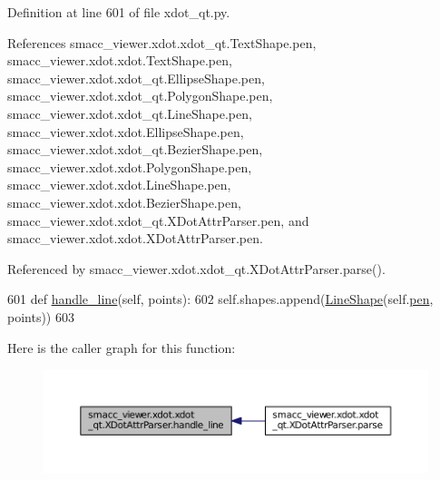 Definition at line 601 of file xdot\+\_\+qt.\+py.



References smacc\+\_\+viewer.\+xdot.\+xdot\+\_\+qt.\+Text\+Shape.\+pen, smacc\+\_\+viewer.\+xdot.\+xdot.\+Text\+Shape.\+pen, smacc\+\_\+viewer.\+xdot.\+xdot\+\_\+qt.\+Ellipse\+Shape.\+pen, smacc\+\_\+viewer.\+xdot.\+xdot\+\_\+qt.\+Polygon\+Shape.\+pen, smacc\+\_\+viewer.\+xdot.\+xdot\+\_\+qt.\+Line\+Shape.\+pen, smacc\+\_\+viewer.\+xdot.\+xdot.\+Ellipse\+Shape.\+pen, smacc\+\_\+viewer.\+xdot.\+xdot\+\_\+qt.\+Bezier\+Shape.\+pen, smacc\+\_\+viewer.\+xdot.\+xdot.\+Polygon\+Shape.\+pen, smacc\+\_\+viewer.\+xdot.\+xdot.\+Line\+Shape.\+pen, smacc\+\_\+viewer.\+xdot.\+xdot.\+Bezier\+Shape.\+pen, smacc\+\_\+viewer.\+xdot.\+xdot\+\_\+qt.\+X\+Dot\+Attr\+Parser.\+pen, and smacc\+\_\+viewer.\+xdot.\+xdot.\+X\+Dot\+Attr\+Parser.\+pen.



Referenced by smacc\+\_\+viewer.\+xdot.\+xdot\+\_\+qt.\+X\+Dot\+Attr\+Parser.\+parse().


\begin{DoxyCode}
601     \textcolor{keyword}{def }\hyperlink{classsmacc__viewer_1_1xdot_1_1xdot__qt_1_1XDotAttrParser_ab42ceac254c826cf805a4a9a80154db8}{handle\_line}(self, points):
602         self.shapes.append(\hyperlink{classsmacc__viewer_1_1xdot_1_1xdot__qt_1_1LineShape}{LineShape}(self.\hyperlink{classsmacc__viewer_1_1xdot_1_1xdot__qt_1_1XDotAttrParser_a22ec4e08bbdb0ba31a8b5e09db560d8c}{pen}, points))
603 
\end{DoxyCode}


Here is the caller graph for this function\+:
\nopagebreak
\begin{figure}[H]
\begin{center}
\leavevmode
\includegraphics[width=350pt]{classsmacc__viewer_1_1xdot_1_1xdot__qt_1_1XDotAttrParser_ab42ceac254c826cf805a4a9a80154db8_icgraph}
\end{center}
\end{figure}


